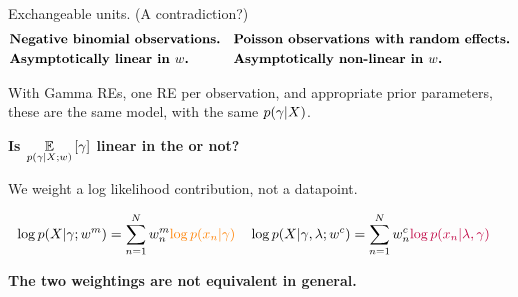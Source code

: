 \begin{frame}[t]{Exchangeable units.  (A contradiction?)}
    \vspace{-1em}
    \begin{align*}
    &\text{\textbf{Negative binomial observations.}}
    &
    &\text{\textbf{Poisson observations with random effects.}}
    \\
    &\text{\textbf{Asymptotically linear in $w$.}}
    &
    &\text{\textbf{Asymptotically non-linear in $w$.}}
    \end{align*}
    \begin{center}
        With Gamma REs, one RE per observation, and appropriate prior parameters,\\
        these are the same model, with the same $p(\gamma \vert X)$.
        
    \textbf{Is $\underset{p(\gamma \vert X; w)}{\mathbb{E}}\left[\gamma\right]$
    linear in the 
    or not?}
    
    \spskip

    \textbf{}  We weight a log likelihood
    contribution, not a datapoint.

    \begin{align*}
        &\log p(X \vert \gamma; w^{m}) =
            \sum_{n=1}^N w^{m}_n 
            \textcolor{orange}{\log p(x_n \vert \gamma)}
        &
        &\log p(X \vert \gamma, \lambda; w^{c}) =
            \sum_{n=1}^N w^{c}_n 
            \textcolor{purple}{\log p(x_n \vert \lambda, \gamma)}
    \end{align*}
        

    \textbf{The two weightings are not equivalent in general.}

    
    \end{center}
\end{frame}


